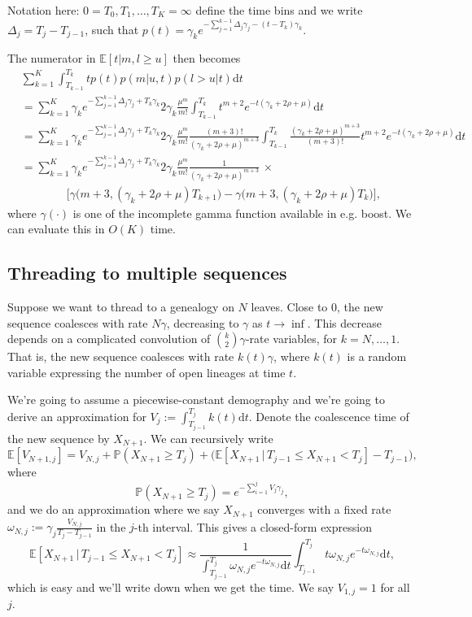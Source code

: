 \documentclass[a4paper]{article}
\newcommand{\E}{\mathbb{E}}
\renewcommand{\P}{\mathbb{P}}
\renewcommand{\d}{\mathrm{d}}
\begin{document}
Notation here: $0=T_0,T_1,\ldots,T_K=\infty$ define the time bins and
we write $\Delta_j = T_j - T_{j-1}$,
such that $p(t)=\gamma_ke^{-\sum_{j=1}^{k-1}\Delta_j\gamma_j - (t-T_k)\gamma_k}$.

The numerator in $\E[t|m, l\geq u]$ then becomes
\begin{align*}
  &\sum_{k=1}^K \int_{T_{k-1}}^{T_k} tp(t)p(m|u,t)p(l>u|t)\d t\\
  &=\sum_{k=1}^K\gamma_ke^{-\sum_{j=1}^{k-1}\Delta_j\gamma_j + T_k\gamma_k}
  2\gamma_k\frac{\mu^m}{m!}\int_{T_{k-1}}^{T_k} 
  t^{m+2}e^{-t(\gamma_k + 2\rho + \mu) }
  \d t\\
     &= \sum_{k=1}^K\gamma_ke^{-\sum_{j=1}^{k-1}\Delta_j\gamma_j + T_k\gamma_k}
  2\gamma_k\frac{\mu^m}{m!}
  \frac{(m+3)!}{(\gamma_k + 2\rho + \mu)^{m+3}}
  \int_{T_{k-1}}^{T_k} \frac{(\gamma_k + 2\rho + \mu)^{m+3}}{(m+3)!}
  t^{m+2}e^{-t(\gamma_k + 2\rho + \mu) }
  \d t\\
     &=\sum_{k=1}^K\gamma_ke^{-\sum_{j=1}^{k-1}\Delta_j\gamma_j + T_k\gamma_k}
  2\gamma_k\frac{\mu^m}{m!}
  \frac{1}{(\gamma_k + 2\rho + \mu)^{m+3}} \,\times\\
     &\qquad\qquad\bigg[
  \gamma\big(m+3, (\gamma_k + 2\rho + \mu)T_{k+1}\big)-
  \gamma\big(m+3, (\gamma_k + 2\rho + \mu)T_{k}\big)
\bigg],
\end{align*}
where $\gamma(\cdot)$ is one of the incomplete gamma function available in e.g. boost.
We can evaluate this in $O(K)$ time.

\subsection*{Threading to multiple sequences}

Suppose we want to thread to a genealogy on $N$ leaves.
Close to $0$, the new sequence coalesces with rate $N\gamma$, decreasing
to $\gamma$ as $t\to\inf$.
This decrease depends on a complicated convolution of $\binom{k}{2}\gamma$-rate variables,
for $k=N,\ldots,1$.
That is, the new sequence coalesces with rate $k(t)\gamma$, where $k(t)$ is a random variable
expressing the number of open lineages at time $t$.

We're going to assume a piecewise-constant demography and we're going to derive an
approximation for $V_j:=\int_{T_{j-1}}^{T_j}k(t)\d t$.
Denote the coalescence time of the new sequence by $X_{N+1}$.
We can recursively write
\[
  \E[V_{N+1,j}] = V_{N,j} + \P(X_{N+1} \geq T_j) + \Big(\E[X_{N+1}\,|\, T_{j-1}\leq X_{N+1}<T_j] - T_{j-1}\Big),
\]
where 
\[
  \P(X_{N+1}\geq T_j) = e^{-\sum_{i=1}^j V_j\gamma_j},
\]
and we do an approximation where we say $X_{N+1}$ converges with a fixed rate $\omega_{N,j}:=\gamma_j\frac{V_{N,j}}{T_j - T_{j-1}}$
in the $j$-th interval.
This gives a closed-form expression
\[
  \E[X_{N+1}\,|\, T_{j-1}\leq X_{N+1}<T_j] \approx 
  \frac{1}{\int_{T_{j-1}}^{T_j}\omega_{N,j}e^{-t\omega_{N,j} }\d t}
  \int_{T_{j-1}}^{T_j}t\omega_{N,j} e^{-t\omega_{N,j}}\d t,
\]
which is easy and we'll write down when we get the time.
We say $V_{1,j}=1$ for all $j$.
\end{document}
